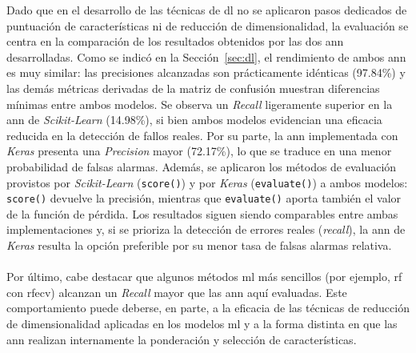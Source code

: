 Dado que en el desarrollo de las técnicas de \gls{dl} no se aplicaron pasos dedicados de puntuación de características ni de reducción de dimensionalidad, la evaluación se centra en la comparación de los resultados obtenidos por las dos \gls{ann} desarrolladas. Como se indicó en la Sección~\ref{sec:dl}, el rendimiento de ambos \gls{ann} es muy similar: las precisiones alcanzadas son prácticamente idénticas (97.84\%) y las demás métricas derivadas de la matriz de confusión muestran diferencias mínimas entre ambos modelos. Se observa un \textit{Recall} ligeramente superior en la \gls{ann} de \textit{Scikit-Learn} (14.98\%), si bien ambos modelos evidencian una eficacia reducida en la detección de fallos reales. Por su parte, la \gls{ann} implementada con \textit{Keras} presenta una \textit{Precision} mayor (72.17\%), lo que se traduce en una menor probabilidad de falsas alarmas. Además, se aplicaron los métodos de evaluación provistos por \textit{Scikit-Learn} (\texttt{score()}) y por \textit{Keras} (\texttt{evaluate()}) a ambos modelos: \texttt{score()} devuelve la precisión, mientras que \texttt{evaluate()} aporta también el valor de la función de pérdida. Los resultados siguen siendo comparables entre ambas implementaciones y, si se prioriza la detección de errores reales (\textit{recall}), la \gls{ann} de \textit{Keras} resulta la opción preferible por su menor tasa de falsas alarmas relativa.\\
\\
Por último, cabe destacar que algunos métodos \gls{ml} más sencillos (por ejemplo, \gls{rf} con \gls{rfecv}) alcanzan un \textit{Recall} mayor que las \gls{ann} aquí evaluadas. Este comportamiento puede deberse, en parte, a la eficacia de las técnicas de reducción de dimensionalidad aplicadas en los modelos \gls{ml} y a la forma distinta en que las \gls{ann} realizan internamente la ponderación y selección de características.

